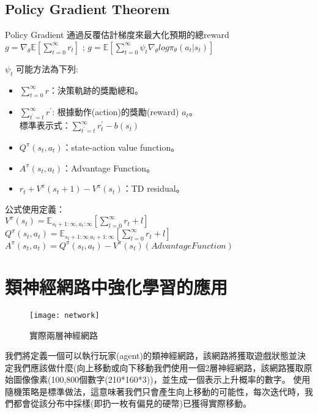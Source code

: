 \subsection{Policy Gradient Theorem}
Policy Gradient 通過反覆估計梯度來最大化預期的總reward\\[5pt]
$g = \nabla_\theta\mathbb{E}[\sum_{t=0}^\infty r_t]$ ; $g = \mathbb{E}[\sum_{t=0}^\infty\psi_t\nabla_\theta log\pi_\theta(a_t \vert s_t)]$\\[5pt]
\begin{Large}{$\psi_t$ 可能方法為下列:}\end{Large}
\begin{itemize}
\item $\sum_{t=0}^\infty r$：決策軌跡的獎勵總和。
\item $\sum_{t^{'}=t}^\infty r^{'}$: 根據動作(action)的獎勵(reward) $a_t$。\\
標準表示式：$\sum_{t^{'}=t}^\infty r_t^{'}-b(s_t)$
\item $Q^\pi(s_t,a_t)$：state-action value function。
\item $A^\pi(s_t,a_t)$：Advantage Function。
\item $r_t+V^\pi(s_t+1)-V^\pi(s_t)$：TD residual。
\end{itemize}
公式使用定義：\\[5pt]
$V^\pi(s_t) = \mathbb{E}_{s_{t}+1:\infty,a_{t}:\infty}[\sum_{l=0}^\infty r_t+l]$\\[5pt]
$Q^\pi(s_t,a_t) = \mathbb{E}_{s_{t}+1:\infty_,a_{t}+1:\infty}[\sum_{l=0}^\infty r_t+l]$\\[5pt]
$A^\pi(s_t,a_t) = Q^\pi(s_t,a_t)-V^\pi(s_t)(Advantage Function)$\\[5pt]
\section{類神經網路中強化學習的應用}
\begin{figure}[hbt!]
\begin{center}
\texttt{[image: network]}
\caption{實際兩層神經網路}
\end{center}
\end{figure}

 我們將定義一個可以執行玩家(agent)的類神經網路，該網路將獲取遊戲狀態並決定我們應該做什麼(向上移動或向下移動我們使用一個2層神經網路，該網路獲取原始圖像像素(100,800個數字(210*160*3))，並生成一個表示上升概率的數字。 使用隨機策略是標準做法，這意味著我們只會產生向上移動的可能性，每次迭代時，我們都會從該分布中採樣(即扔一枚有偏見的硬幣)已獲得實際移動。\\

